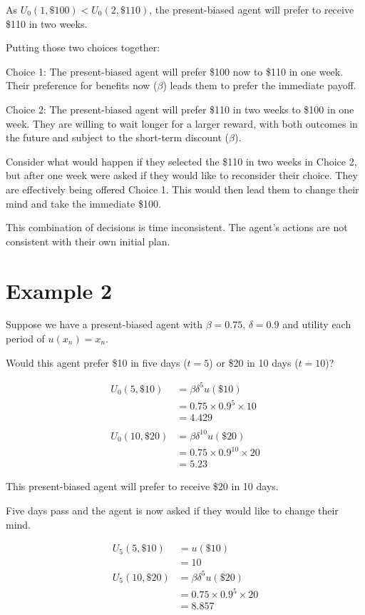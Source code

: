 \documentclass[
  letterpaper,
  DIV=11,
  numbers=noendperiod]{scrreprt}
\begin{document}
As \(U_0(1,\$100) < U_0(2,\$110)\), the present-biased agent will prefer
to receive \$110 in two weeks.

Putting those two choices together:

Choice 1: The present-biased agent will prefer \$100 now to \$110 in one
week. Their preference for benefits now (\(\beta\)) leads them to prefer
the immediate payoff.

Choice 2: The present-biased agent will prefer \$110 in two weeks to
\$100 in one week. They are willing to wait longer for a larger reward,
with both outcomes in the future and subject to the short-term discount
(\(\beta\)).

Consider what would happen if they selected the \$110 in two weeks in
Choice 2, but after one week were asked if they would like to reconsider
their choice. They are effectively being offered Choice 1. This would
then lead them to change their mind and take the immediate \$100.

This combination of decisions is time inconsistent. The agent's actions
are not consistent with their own initial plan.

\hypertarget{example-2-3}{%
\section{Example 2}\label{example-2-3}}

Suppose we have a present-biased agent with \(\beta=0.75\),
\(\delta=0.9\) and utility each period of \(u(x_n)=x_n\).

Would this agent prefer \$10 in five days (\(t=5\)) or \$20 in 10 days
(\(t=10\))?

\begin{align*}
U_0(5,\$10)&=\beta\delta^5u(\$10) \\
&=0.75\times 0.9^5\times 10 \\
&=4.429 \\
\\
U_0(10,\$20)&=\beta\delta^10 u(\$20) \\
&=0.75\times 0.9^{10}\times 20 \\
&=5.23
\end{align*}

This present-biased agent will prefer to receive \$20 in 10 days.

Five days pass and the agent is now asked if they would like to change
their mind.

\begin{align*}
U_5(5,\$10)&=u(\$10) \\
&=10
\\
U_5(10,\$20)&=\beta\delta^5 u(\$20) \\
&=0.75\times 0.9^5\times 20 \\
&=8.857
\end{align*}
\end{document}
